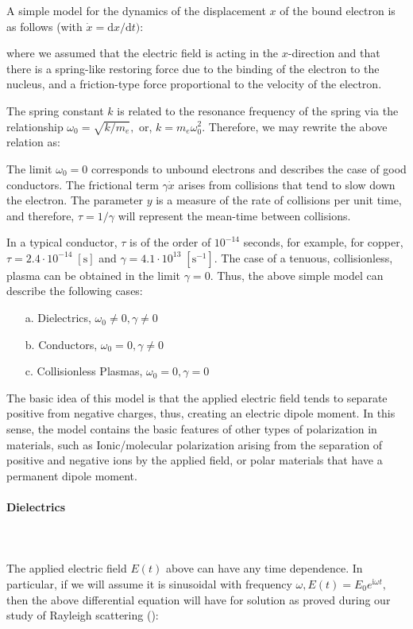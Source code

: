 	A simple model for the dynamics of the displacement $x$ of the bound electron is as follows (with $\dot{x}=\mathrm{d} x / \mathrm{d} t)$:
	
	where we assumed that the electric field is acting in the $x$-direction and that there is a spring-like restoring force due to the binding of the electron to the nucleus, and a friction-type force proportional to the velocity of the electron.

	The spring constant $k$ is related to the resonance frequency of the spring via the relationship $\omega_{0}=\sqrt{k / m_e},$ or, $k=m_e \omega_{0}^{2}$. Therefore, we may rewrite the above relation as:
	
	The limit $\omega_{0}=0$ corresponds to unbound electrons and describes the case of good conductors. The frictional term $\gamma \dot{x}$ arises from collisions that tend to slow down the electron. The parameter $y$ is a measure of the rate of collisions per unit time, and therefore, $\tau=1 / \gamma$ will represent the mean-time between collisions.

	In a typical conductor, $\tau$ is of the order of $10^{-14}$ seconds, for example, for copper, $\tau=2.4 \cdot 10^{-14}\; [\text{s}]$ and $\gamma=4.1 \cdot 10^{13}\; [\text{s}^{-1}]$. The case of a tenuous, collisionless, plasma can be obtained in the limit $\gamma=0$. Thus, the above simple model can describe the following cases:
	\begin{itemize}
		\item[a.] Dielectrics, $\omega_{0} \neq 0, \gamma \neq 0$
		\item[b.] Conductors, $\omega_{0}=0, \gamma \neq 0$
		\item[c.] Collisionless Plasmas, $\omega_{0}=0, \gamma=0$
	\end{itemize}
	The basic idea of this model is that the applied electric field tends to separate positive from negative charges, thus, creating an electric dipole moment. In this sense, the model contains the basic features of other types of polarization in materials, such as Ionic/molecular polarization arising from the separation of positive and negative ions by the applied field, or polar materials that have a permanent dipole moment.
	
	\paragraph{Dielectrics}\mbox{}\\\\
	The applied electric field $E(t)$ above can have any time dependence. In particular, if we will assume it is sinusoidal with frequency $\omega, E(t)=E_0 e^{\mathrm{i}\omega t},$ then the above differential equation will have for solution as proved during our study of Rayleigh scattering ():
	
